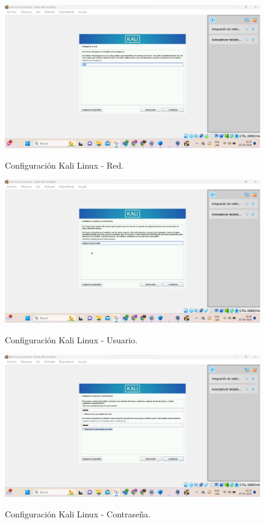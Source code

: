 \documentclass[stu, 11pt, letterpaper, donotrepeattitle, floatsintext, natbib]{apa7}
\begin{document}
\begin{figure}[H]
    \centering
    \caption{Configuración Kali Linux - Red.}
    \includegraphics[width=0.5\linewidth]{imagenCap2/19.png} %
    \label{fig:OverallEffect}
\end{figure}

\begin{figure}[H]
    \centering
    \caption{Configuración Kali Linux - Usuario.}
    \includegraphics[width=0.5\linewidth]{imagenCap2/20.png} %
    \label{fig:OverallEffect}
\end{figure}

\begin{figure}[H]
    \centering
    \caption{Configuración Kali Linux - Contraseña.}
    \includegraphics[width=0.5\linewidth]{imagenCap2/21.png} %
    \label{fig:OverallEffect}
\end{figure}
\end{document}
